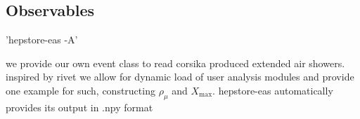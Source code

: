 \subsection{Observables}

'hepstore-eas -A'

we provide our own event class to read corsika produced extended air
showers. inspired by rivet we allow for dynamic load of user analysis
modules and provide one example for such, constructing $\rho_\mu$ and
$X_\text{max}$. hepstore-eas automatically provides its output in .npy
format
